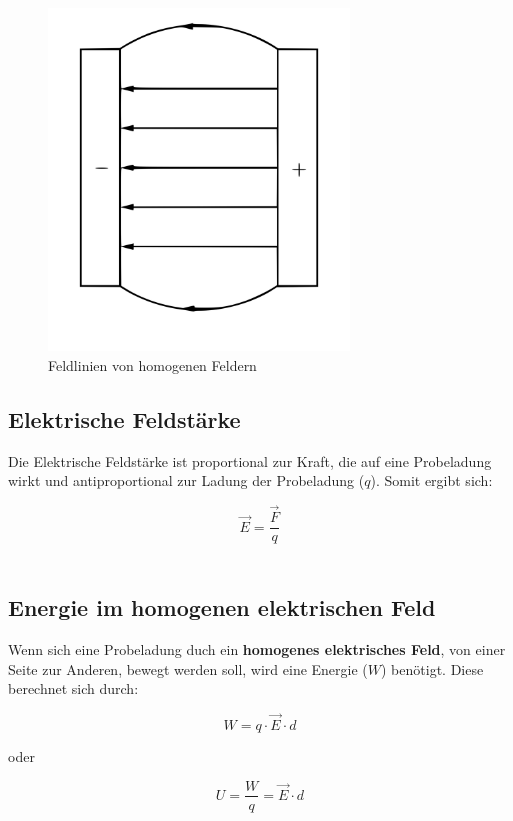 \documentclass[a4paper]{article}
\begin{document}
\begin{figure} [h]
	\begin{center}
		\includegraphics[width=8cm]{Bilder/homFeld.png}
		\caption{Feldlinien von homogenen Feldern}
	\end{center}
\end{figure}



\subsection{Elektrische Feldstärke}
Die Elektrische Feldstärke ist proportional zur Kraft, die auf eine Probeladung wirkt und antiproportional
zur Ladung der Probeladung ($q$). Somit ergibt sich:

\Large$$\vec{E} = \dfrac{\vec{F}}{q}$$\normalsize\\



\newpage
\subsection{Energie im homogenen elektrischen Feld}
Wenn sich eine Probeladung duch ein \textbf{homogenes elektrisches Feld}, von einer Seite zur Anderen,
bewegt werden soll, wird eine Energie ($W$) benötigt. Diese berechnet sich durch:

\Large$$W = q \cdot \vec{E} \cdot d$$\normalsize

\begin{center}
	\vspace{0,4cm}oder
\end{center}

\Large$$U = \dfrac{W}{q} = \vec{E} \cdot d$$\normalsize\\
\end{document}
